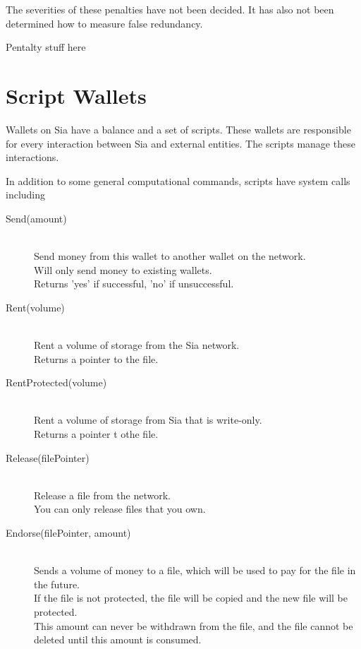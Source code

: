 \documentclass[twocolumn]{article}
\begin{document}
The severities of these penalties have not been decided.
It has also not been determined how to measure false redundancy.

\begin{center}
Pentalty stuff here
\end{center}

\section{Script Wallets}

Wallets on Sia have a balance and a set of scripts.
These wallets are responsible for every interaction between Sia and external entities.
The scripts manage these interactions.

In addition to some general computational commands, scripts have system calls including

\begin{description}
	\item[Send(amount)] \hfill \\
	Send money from this wallet to another wallet on the network. \\
	Will only send money to existing wallets. \\
	Returns 'yes' if successful, 'no' if unsuccessful.
	\item[Rent(volume)] \hfill \\
	Rent a volume of storage from the Sia network. \\
	Returns a pointer to the file.
	\item[RentProtected(volume)] \hfill \\
	Rent a volume of storage from Sia that is write-only. \\
	Returns a pointer t othe file.
	\item[Release(filePointer)] \hfill \\
	Release a file from the network. \\
	You can only release files that you own.
	\item[Endorse(filePointer, amount)] \hfill \\
	Sends a volume of money to a file, which will be used to pay for the file in the future. \\
	If the file is not protected, the file will be copied and the new file will be protected. \\
	This amount can never be withdrawn from the file, and the file cannot be deleted until this amount is consumed.
\end{description}
\end{document}
